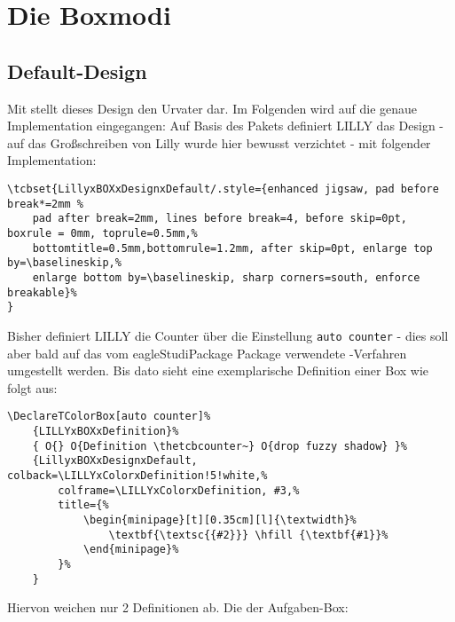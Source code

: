 \section{Die Boxmodi}
\subsection{Default-Design}
Mit  stellt dieses Design den Urvater dar. Im Folgenden wird auf die genaue Implementation eingegangen:\newline
Auf Basis des Pakets  definiert LILLY das Design  - auf das Großschreiben von Lilly wurde hier bewusst verzichtet - mit folgender Implementation:
{\scriptsize\begin{lstlisting}[style=latex]
\tcbset{LillyxBOXxDesignxDefault/.style={enhanced jigsaw, pad before break*=2mm %
    pad after break=2mm, lines before break=4, before skip=0pt, boxrule = 0mm, toprule=0.5mm,% 
    bottomtitle=0.5mm,bottomrule=1.2mm, after skip=0pt, enlarge top by=\baselineskip,%
    enlarge bottom by=\baselineskip, sharp corners=south, enforce breakable}%
}
\end{lstlisting}}
Bisher definiert LILLY die Counter über die Einstellung \verb|auto counter| - dies soll aber bald auf das vom eagleStudiPackage Package verwendete -Verfahren umgestellt werden. Bis dato sieht eine exemplarische Definition einer Box wie folgt aus:
{\scriptsize\begin{lstlisting}[style=latex]
\DeclareTColorBox[auto counter]%
    {LILLYxBOXxDefinition}%
    { O{} O{Definition \thetcbcounter~} O{drop fuzzy shadow} }%
    {LillyxBOXxDesignxDefault, colback=\LILLYxColorxDefinition!5!white,%
        colframe=\LILLYxColorxDefinition, #3,%
        title={%
            \begin{minipage}[t][0.35cm][l]{\textwidth}%
                \textbf{\textsc{{#2}}} \hfill {\textbf{#1}}%
            \end{minipage}%
        }%
    }
\end{lstlisting}}
Hiervon weichen nur 2 Definitionen ab. Die der Aufgaben-Box:

